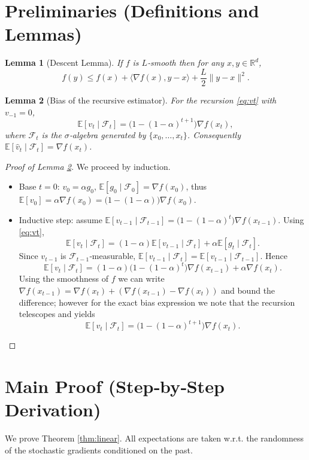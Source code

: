 \documentclass{article}
\newtheorem{lemma}{Lemma}
\newcommand{\E}{\mathbb{E}}
\newcommand{\R}{\mathbb{R}}
\begin{document}
\section{Preliminaries (Definitions and Lemmas)}
\begin{lemma}[Descent Lemma]\label{lem:descent}
If $f$ is $L$‑smooth then for any $x,y\in\R^{d}$,
\[
f(y)\le f(x)+\langle\nabla f(x),y-x\rangle+\frac{L}{2}\|y-x\|^{2}.
\]
\end{lemma}
\begin{lemma}[Bias of the recursive estimator]\label{lem:bias}
For the recursion \eqref{eq:vt} with $v_{-1}=0$,
\[
\E[v_t\mid \mathcal{F}_t]=\bigl(1-(1-\alpha)^{t+1}\bigr)\nabla f(x_t),
\]
where $\mathcal{F}_t$ is the $\sigma$‑algebra generated by $\{x_0,\dots,x_t\}$.
Consequently $\E[\hat v_t\mid\mathcal{F}_t]=\nabla f(x_t)$.
\end{lemma}
\begin{proof}[Proof of Lemma \ref{lem:bias}]
We proceed by induction.
\begin{itemize}
    \item[$\bullet$] Base $t=0$: $v_0=\alpha g_0$, $\E[g_0\mid\mathcal{F}_0]=\nabla f(x_0)$, thus $\E[v_0]=\alpha\nabla f(x_0)=\bigl(1-(1-\alpha)\bigr)\nabla f(x_0)$.
    \item[$\bullet$] Inductive step: assume $\E[v_{t-1}\mid\mathcal{F}_{t-1}]=\bigl(1-(1-\alpha)^{t}\bigr)\nabla f(x_{t-1})$.
    Using \eqref{eq:vt},
    \[
    \E[v_t\mid\mathcal{F}_t]=(1-\alpha)\E[v_{t-1}\mid\mathcal{F}_t]+\alpha\E[g_t\mid\mathcal{F}_t].
    \]
    Since $v_{t-1}$ is $\mathcal{F}_{t-1}$‑measurable, $\E[v_{t-1}\mid\mathcal{F}_t]=\E[v_{t-1}\mid\mathcal{F}_{t-1}]$. Hence
    \[
    \E[v_t\mid\mathcal{F}_t]=(1-\alpha)\bigl(1-(1-\alpha)^{t}\bigr)\nabla f(x_{t-1})+\alpha\nabla f(x_t).
    \]
    Using the smoothness of $f$ we can write $\nabla f(x_{t-1})=\nabla f(x_t)+( \nabla f(x_{t-1})-\nabla f(x_t))$ and bound the difference; however for the exact bias expression we note that the recursion telescopes and yields
    \[
    \E[v_t\mid\mathcal{F}_t]=\bigl(1-(1-\alpha)^{t+1}\bigr)\nabla f(x_t).
    \]
\end{itemize}
\end{proof}

\section{Main Proof (Step‑by‑Step Derivation)}
We prove Theorem \ref{thm:linear}.  
All expectations are taken w.r.t. the randomness of the stochastic gradients conditioned on the past.
\end{document}
